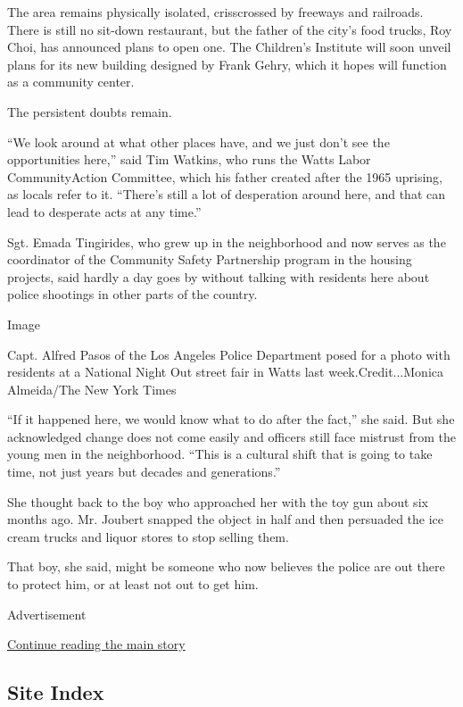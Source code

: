 The area remains physically isolated, crisscrossed by freeways and
railroads. There is still no sit-down restaurant, but the father of the
city's food trucks, Roy Choi, has announced plans to open one. The
Children's Institute will soon unveil plans for its new building
designed by Frank Gehry, which it hopes will function as a community
center.

The persistent doubts remain.

``We look around at what other places have, and we just don't see the
opportunities here,'' said Tim Watkins, who runs the Watts Labor
CommunityAction Committee, which his father created after the 1965
uprising, as locals refer to it. ``There's still a lot of desperation
around here, and that can lead to desperate acts at any time.''

Sgt. Emada Tingirides, who grew up in the neighborhood and now serves as
the coordinator of the Community Safety Partnership program in the
housing projects, said hardly a day goes by without talking with
residents here about police shootings in other parts of the country.

Image

Capt. Alfred Pasos of the Los Angeles Police Department posed for a
photo with residents at a National Night Out street fair in Watts last
week.Credit...Monica Almeida/The New York Times

``If it happened here, we would know what to do after the fact,'' she
said. But she acknowledged change does not come easily and officers
still face mistrust from the young men in the neighborhood. ``This is a
cultural shift that is going to take time, not just years but decades
and generations.''

She thought back to the boy who approached her with the toy gun about
six months ago. Mr. Joubert snapped the object in half and then
persuaded the ice cream trucks and liquor stores to stop selling them.

That boy, she said, might be someone who now believes the police are out
there to protect him, or at least not out to get him.

Advertisement

\protect\hyperlink{after-bottom}{Continue reading the main story}

\hypertarget{site-index}{%
\subsection{Site Index}\label{site-index}}

